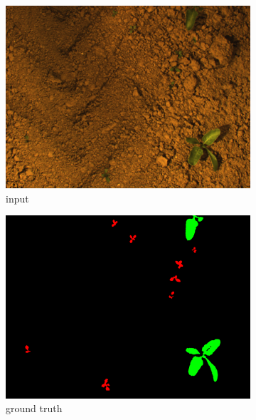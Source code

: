     
    \begin{figure}
    \centering
     \begin{subfigure}[b]{0.31\linewidth}
    \includegraphics[width=\linewidth]{pics/unsupervised/img_masks_8mm_fromImages_frame256.png}
   		\caption{input}
		\label{unsup_img}    		
   \end{subfigure}
        \begin{subfigure}[b]{0.31\linewidth}
    \includegraphics[width=\linewidth]{pics/unsupervised/gt_masks_8mm_fromImages_frame256_GroundTruth_iMap.png}
   		\caption{ground truth}
		\label{unsup_gt}    		
   \end{subfigure}
      \begin{subfigure}[b]{0.31\linewidth}

\end{subfigure}
\end{figure}
